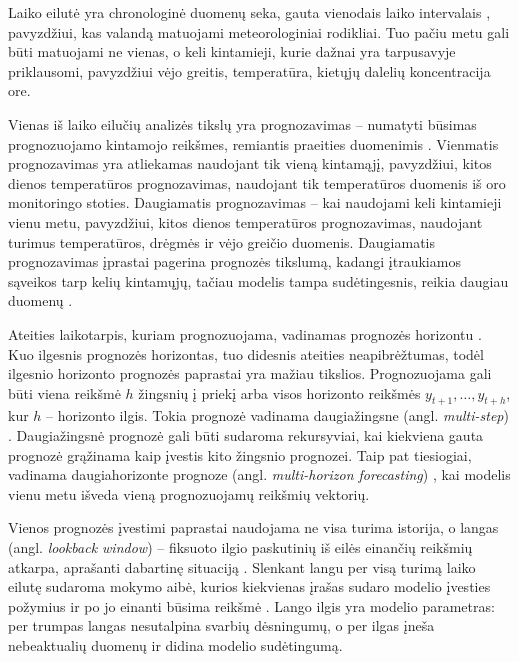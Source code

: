 \documentclass[]{VUMIFTemplateClass}
\begin{document}
    Laiko eilutė yra chronologinė duomenų seka, gauta vienodais laiko intervalais \cite{hyndman}, pavyzdžiui, kas valandą matuojami meteorologiniai rodikliai.
    Tuo pačiu metu gali būti matuojami ne vienas, o keli kintamieji, kurie dažnai yra tarpusavyje priklausomi, pavyzdžiui vėjo greitis, temperatūra, kietųjų dalelių koncentracija ore.

    Vienas iš laiko eilučių analizės tikslų yra prognozavimas -- numatyti būsimas prognozuojamo kintamojo reikšmes, remiantis praeities duomenimis \cite{cryer1986time}.
    Vienmatis prognozavimas yra atliekamas naudojant tik vieną kintamąjį, pavyzdžiui, kitos dienos temperatūros prognozavimas, naudojant tik temperatūros duomenis iš oro monitoringo stoties.
    Daugiamatis prognozavimas -- kai naudojami keli kintamieji vienu metu, pavyzdžiui, kitos dienos temperatūros prognozavimas, naudojant turimus temperatūros, drėgmės ir vėjo greičio duomenis.
    Daugiamatis prognozavimas įprastai pagerina prognozės tikslumą, kadangi įtraukiamos sąveikos tarp kelių kintamųjų, tačiau modelis tampa sudėtingesnis, reikia daugiau duomenų \cite{kim2025comprehensivesurveydeeplearning}.

    Ateities laikotarpis, kuriam prognozuojama, vadinamas prognozės horizontu \cite{hyndman}.
    Kuo ilgesnis prognozės horizontas, tuo didesnis ateities neapibrėžtumas, todėl ilgesnio horizonto prognozės paprastai yra mažiau tikslios.
    Prognozuojama gali būti viena reikšmė $h$ žingsnių į priekį arba visos horizonto reikšmės $y_{t+1}, \dots, y_{t+h}$, kur $h$ -- horizonto ilgis.
    Tokia prognozė vadinama daugiažingsne (angl. \textit{multi-step}) \cite{strategiestimeseries}.
    Daugiažingsnė prognozė gali būti sudaroma rekursyviai, kai kiekviena gauta prognozė grąžinama kaip įvestis kito žingsnio prognozei.
    Taip pat tiesiogiai, vadinama daugiahorizonte prognoze (angl. \textit{multi-horizon forecasting}) \cite{lim2021}, kai modelis vienu metu išveda vieną prognozuojamų reikšmių vektorių.

    Vienos prognozės įvestimi paprastai naudojama ne visa turima istorija, o langas (angl. \textit{lookback window}) -- fiksuoto ilgio paskutinių iš eilės einančių reikšmių atkarpa, aprašanti dabartinę situaciją \cite{kim2025comprehensivesurveydeeplearning}.
    Slenkant langu per visą turimą laiko eilutę sudaroma mokymo aibė, kurios kiekvienas įrašas sudaro modelio įvesties požymius ir po jo einanti būsima reikšmė \cite{strategiestimeseries}.
    Lango ilgis yra modelio parametras: per trumpas langas nesutalpina svarbių dėsningumų, o per ilgas įneša nebeaktualių duomenų ir didina modelio sudėtingumą.
\end{document}
